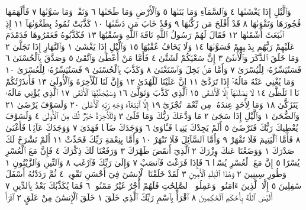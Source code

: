 وَٱلَّيْلِ إِذَا يَغْشَىٰهَا ٤ وَٱلسَّمَآءِ وَمَا بَنَىٰهَا ٥ وَٱلْأَرْضِ
وَمَا طَحَىٰهَا ٦ وَنَفْسࣲ وَمَا سَوَّىٰهَا ٧ فَأَلْهَمَهَا فُجُورَهَا
وَتَقْوَىٰهَا ٨ قَدْ أَفْلَحَ مَن زَكَّىٰهَا ٩ وَقَدْ خَابَ مَن دَسَّىٰهَا ١٠
كَذَّبَتْ ثَمُودُ بِطَغْوَىٰهَآ ١١ إِذِ ٱنۢبَعَثَ أَشْقَىٰهَا ١٢ فَقَالَ لَهُمْ
رَسُولُ ٱللَّهِ نَاقَةَ ٱللَّهِ وَسُقْيَٰهَا ١٣ فَكَذَّبُوهُ فَعَقَرُوهَا فَدَمْدَمَ
عَلَيْهِمْ رَبُّهُم بِذَنۢبِهِمْ فَسَوَّىٰهَا ١٤ وَلَا يَخَافُ عُقْبَٰهَا ١٥
وَٱلَّيْلِ إِذَا يَغْشَىٰ ١ وَٱلنَّهَارِ إِذَا تَجَلَّىٰ ٢ وَمَا خَلَقَ ٱلذَّكَرَ وَٱلْأُنثَىٰٓ ٣
إِنَّ سَعْيَكُمْ لَشَتَّىٰ ٤ فَأَمَّا مَنْ أَعْطَىٰ وَٱتَّقَىٰ ٥ وَصَدَّقَ بِٱلْحُسْنَىٰ ٦
فَسَنُيَسِّرُهُۥ لِلْيُسْرَىٰ ٧ وَأَمَّا مَنۢ بَخِلَ وَٱسْتَغْنَىٰ ٨ وَكَذَّبَ بِٱلْحُسْنَىٰ ٩
فَسَنُيَسِّرُهُۥ لِلْعُسْرَىٰ ١٠ وَمَا يُغْنِي عَنْهُ مَالُهُۥٓ إِذَا تَرَدَّىٰٓ ١١ إِنَّ عَلَيْنَا
لَلْهُدَىٰ ١٢ وَإِنَّ لَنَا لَلْأٓخِرَةَ وَٱلْأُولَىٰ ١٣ فَأَنذَرْتُكُمْ نَارࣰا تَلَظَّىٰ ١٤
لَا يَصْلَىٰهَآ إِلَّا ٱلْأَشْقَى ١٥ ٱلَّذِي كَذَّبَ وَتَوَلَّىٰ ١٦ وَسَيُجَنَّبُهَا
ٱلْأَتْقَى ١٧ ٱلَّذِي يُؤْتِي مَالَهُۥ يَتَزَكَّىٰ ١٨ وَمَا لِأَحَدٍ عِندَهُۥ مِن نِّعْمَةࣲ
تُجْزَىٰٓ ١٩ إِلَّا ٱبْتِغَآءَ وَجْهِ رَبِّهِ ٱلْأَعْلَىٰ ٢٠ وَلَسَوْفَ يَرْضَىٰ ٢١
وَٱلضُّحَىٰ ١ وَٱلَّيْلِ إِذَا سَجَىٰ ٢ مَا وَدَّعَكَ رَبُّكَ وَمَا قَلَىٰ ٣
وَلَلْأٓخِرَةُ خَيْرࣱ لَّكَ مِنَ ٱلْأُولَىٰ ٤ وَلَسَوْفَ يُعْطِيكَ رَبُّكَ
فَتَرْضَىٰٓ ٥ أَلَمْ يَجِدْكَ يَتِيمࣰا فَـَٔاوَىٰ ٦ وَوَجَدَكَ ضَآلࣰّا فَهَدَىٰ ٧
وَوَجَدَكَ عَآئِلࣰا فَأَغْنَىٰ ٨ فَأَمَّا ٱلْيَتِيمَ فَلَا تَقْهَرْ ٩
وَأَمَّا ٱلسَّآئِلَ فَلَا تَنْهَرْ ١٠ وَأَمَّا بِنِعْمَةِ رَبِّكَ فَحَدِّثْ ١١
أَلَمْ نَشْرَحْ لَكَ صَدْرَكَ ١ وَوَضَعْنَا عَنكَ وِزْرَكَ ٢
ٱلَّذِيٓ أَنقَضَ ظَهْرَكَ ٣ وَرَفَعْنَا لَكَ ذِكْرَكَ ٤ فَإِنَّ مَعَ ٱلْعُسْرِ يُسْرًا ٥
إِنَّ مَعَ ٱلْعُسْرِ يُسْرࣰا ٦ فَإِذَا فَرَغْتَ فَٱنصَبْ ٧ وَإِلَىٰ رَبِّكَ فَٱرْغَب ٨
وَٱلتِّينِ وَٱلزَّيْتُونِ ١ وَطُورِ سِينِينَ ٢ وَهَٰذَا ٱلْبَلَدِ ٱلْأَمِينِ ٣
لَقَدْ خَلَقْنَا ٱلْإِنسَٰنَ فِيٓ أَحْسَنِ تَقْوِيمࣲ ٤ ثُمَّ رَدَدْنَٰهُ أَسْفَلَ سَٰفِلِينَ ٥
إِلَّا ٱلَّذِينَ ءَامَنُوا۟ وَعَمِلُوا۟ ٱلصَّٰلِحَٰتِ فَلَهُمْ أَجْرٌ غَيْرُ مَمْنُونࣲ ٦
فَمَا يُكَذِّبُكَ بَعْدُ بِٱلدِّينِ ٧ أَلَيْسَ ٱللَّهُ بِأَحْكَمِ ٱلْحَٰكِمِينَ ٨
ٱقْرَأْ بِٱسْمِ رَبِّكَ ٱلَّذِي خَلَقَ ١ خَلَقَ ٱلْإِنسَٰنَ مِنْ عَلَقٍ ٢ ٱقْرَأْ
